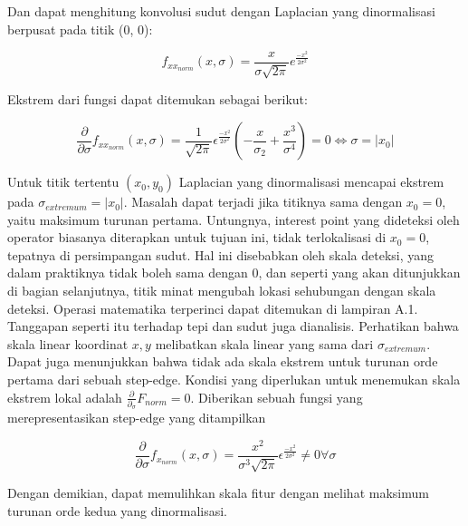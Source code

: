 Dan dapat menghitung konvolusi sudut dengan Laplacian yang dinormalisasi berpusat pada titik (0, 0):

\begin{equation*}
  f_{x x_{norm}}(x,\sigma) = \frac{x}{\sigma \sqrt{2\pi}}e^{\frac{-x^{2}}{2\sigma^{2}}}
\end{equation*}

Ekstrem dari fungsi dapat ditemukan sebagai berikut:

\begin{equation}
  \frac{\partial}{\partial \sigma} f_{xx_{norm}}(x,\sigma) = \frac{1}{\sqrt{2\pi}}\epsilon^{\frac{-x^{2}}{2\sigma^{2}}}(-\frac{x}{\sigma_{2}} + \frac{x^{3}}{\sigma^{4}}) = 0 \Leftrightarrow \sigma = \left\lvert x_{0}\right\rvert 
\end{equation}

Untuk titik tertentu \((x_{0},y_{0})\) Laplacian yang dinormalisasi mencapai ekstrem pada \(\sigma_{extremum}= \left\lvert x_{0}\right\rvert\). 
Masalah dapat terjadi jika titiknya sama dengan \(x_{0} = 0\), yaitu maksimum turunan pertama. Untungnya, interest point yang dideteksi oleh operator biasanya 
diterapkan untuk tujuan ini, tidak terlokalisasi di \(x_{0} =0\), tepatnya di persimpangan sudut. Hal ini disebabkan oleh skala deteksi, yang dalam praktiknya 
tidak boleh sama dengan \(0\), dan seperti yang akan ditunjukkan di bagian selanjutnya, titik minat mengubah lokasi sehubungan dengan skala deteksi. Operasi matematika 
terperinci dapat ditemukan di lampiran A.1. Tanggapan seperti itu terhadap tepi dan sudut juga dianalisis. Perhatikan bahwa skala linear koordinat \(x,y\) melibatkan skala linear yang sama dari \(\sigma_{extremum}\). 
Dapat juga menunjukkan bahwa tidak ada skala ekstrem untuk turunan orde pertama dari sebuah step-edge.
Kondisi yang diperlukan untuk menemukan skala ekstrem lokal adalah \(\frac{\partial}{\partial_{\sigma}}F_{norm} = 0\). 
Diberikan sebuah fungsi yang merepresentasikan step-edge yang ditampilkan 

\begin{equation}
\frac{\partial}{\partial \sigma}f_{x_{norm}}(x,\sigma) = \frac{x^{2}}{\sigma^{3}\sqrt{2\pi}}\epsilon^{\frac{-x^{2}}{2\sigma^{2}}} \neq 0\forall\sigma 
\end{equation}

Dengan demikian, dapat memulihkan skala fitur dengan melihat maksimum turunan orde kedua yang dinormalisasi.

